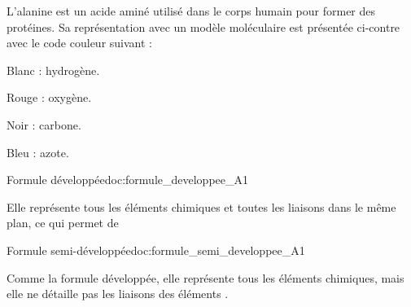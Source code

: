 \vspace*{8pt}
\begin{wrapfigure}[5]{r}{0.3\linewidth}
  \vspace*{-22pt}
\end{wrapfigure}

L'alanine est un acide aminé utilisé dans le corps humain pour former des protéines.
Sa représentation avec un modèle moléculaire est présentée ci-contre avec le code couleur suivant :
\begin{multicols}{2}    
  \begin{listePoints}
    \item Blanc : hydrogène.
    \item Rouge : oxygène.
    \item Noir : carbone.
    \item Bleu : azote.
  \end{listePoints}
\end{multicols}

\medskip
{}



\newpage
\vspace*{-30pt}
\begin{doc}{Formule développée}{doc:formule_developpee_A1}
  \begin{importants}  
    Elle représente tous les éléments chimiques et toutes les liaisons dans le même plan, ce qui permet de 
  \end{importants}

  \exemple*
  \vspace*{-18pt}
  \begin{center}
    \qq{}
  \end{center}
\end{doc}


\begin{doc}{Formule semi-développée}{doc:formule_semi_developpee_A1}
  \begin{importants}
    Comme la formule développée, elle représente tous les éléments chimiques, mais elle ne détaille pas les liaisons des éléments .
  \end{importants}

  \exemple*
  \vspace*{-8pt}
  \begin{center}
    \qq{}
  \end{center}
\end{doc}

